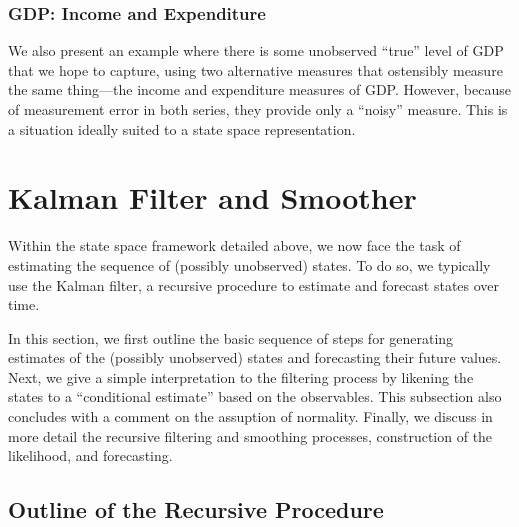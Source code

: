 \documentclass[a4paper,12pt]{article}
\begin{document}
\subsubsection{GDP: Income and Expenditure}
We also present an example where there is some unobserved ``true'' level of GDP that we hope to capture, using two alternative measures that ostensibly measure the same thing---the income and expenditure measures of GDP. However, because of measurement error in both series, they provide only a ``noisy'' measure. This is a situation ideally suited to a state space representation.


\newpage
\section{Kalman Filter and Smoother}

Within the state space framework detailed above, we now face the task of estimating the sequence of (possibly unobserved) states. To do so, we typically use the Kalman filter, a recursive procedure to estimate and forecast states over time. 

In this section, we first outline the basic sequence of steps for generating estimates of the (possibly unobserved) states and forecasting their future values. Next, we give a simple interpretation to the filtering process by likening the states to a ``conditional estimate'' based on the observables. This subsection also concludes with a comment on the assuption of normality. Finally, we discuss in more detail the recursive filtering and smoothing processes, construction of the likelihood, and forecasting. 

\subsection{Outline of the Recursive Procedure}
\end{document}
